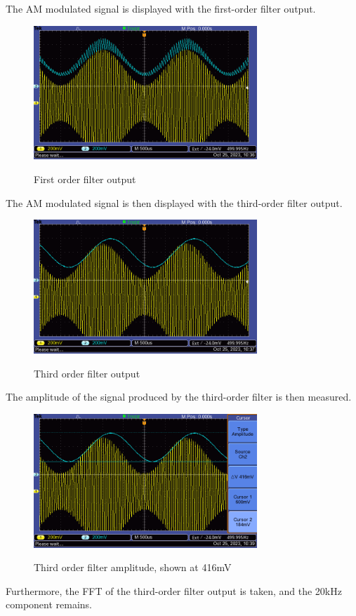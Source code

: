 The AM modulated signal is displayed with the first-order filter output.
\begin{figure}[H]
    \centering
    \includegraphics[width=0.75\textwidth]{images/execution_03_first_order.png}
    \label{fig:execution_03_first_order}
    \caption{First order filter output}
\end{figure}
The AM modulated signal is then displayed with the third-order filter output.
\begin{figure}[H]
    \centering
    \includegraphics[width=0.75\textwidth]{images/execution_03_third_order.png}
    \label{fig:execution_03_third_order}
    \caption{Third order filter output}
\end{figure}

The amplitude of the signal produced by the third-order filter is then measured.

\begin{figure}[H]
    \centering
    \includegraphics[width=0.75\textwidth]{images/execution_03_third_order_amp.png}
    \label{fig:execution_03_third_order_amp}
    \caption{Third order filter amplitude, shown at 416mV}
\end{figure}

Furthermore, the FFT of the third-order filter output is taken, and the 20kHz component remains.



